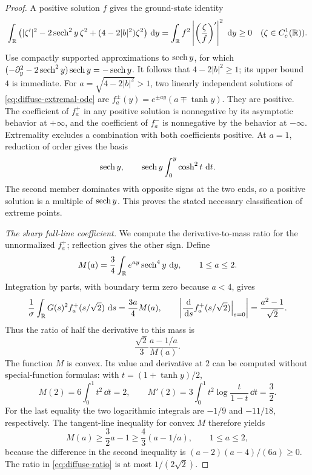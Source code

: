 \begin{proof}
A positive solution $f$ gives the ground-state identity
\[
 \int_\mathbb R\big(|\zeta'|^2-2\operatorname{sech}^2y\,\zeta^2
                         +(4-2|b|^2)\zeta^2\big)\,\,\mathrm d y
 =\int_\mathbb R f^2\left|\left(\frac\zeta f\right)'\right|^2\,\,\mathrm d y\ge0
 \quad(\zeta\in C_c^1(\mathbb R)).
\]
Use compactly supported approximations to $\operatorname{sech} y$, for which
$(-\partial_y^2-2\operatorname{sech}^2y)\operatorname{sech} y=-\operatorname{sech} y$.
It follows that $4-2|b|^2\ge1$; its upper bound $4$ is immediate.
For $a=\sqrt{4-2|b|^2}>1$, two linearly independent solutions of
\eqref{eq:diffuse-extremal-ode} are
$f_a^\pm(y)=e^{\pm ay}(a\mp\tanh y)$. They are positive. The
coefficient of $f_a^+$ in any positive solution is nonnegative by its
asymptotic behavior at $+\infty$, and the coefficient of $f_a^-$ is
nonnegative by the behavior at $-\infty$. Extremality excludes a
combination with both coefficients positive. At $a=1$, reduction of
order gives the basis
\[
 \operatorname{sech} y,\qquad \operatorname{sech} y\int_0^y\cosh^2t\,\,\mathrm d t.
\]
The second member dominates with opposite signs at the two ends, so a
positive solution is a multiple of $\operatorname{sech} y$. This proves the stated
necessary classification of extreme points.

\emph{The sharp full-line coefficient.}
We compute the derivative-to-mass ratio for the unnormalized $f_a^+$;
reflection gives the other sign. Define
\[
 M(a)=\frac34\int_\mathbb R e^{ay}\operatorname{sech}^4y\,\,\mathrm d y,\qquad 1\le a\le2.
\]
Integration by parts, with boundary term zero because $a<4$, gives
\[
 \frac1\sigma\int_\mathbb R G(s)^2f_a^+(s/\sqrt2)\,\,\mathrm d s
       =\frac{3a}{4}M(a),\qquad
 \left|\frac{\,\mathrm d}{\,\mathrm d s}f_a^+(s/\sqrt2)\Big|_{s=0}\right|
       =\frac{a^2-1}{\sqrt2}.
\]
Thus the ratio of half the derivative to this mass is
\begin{equation}\label{eq:diffuse-ratio}
 \frac{\sqrt2}{3}\frac{a-1/a}{M(a)}.
\end{equation}
The function $M$ is convex. Its value and derivative at $2$ can be
computed without special-function formulas: with $t=(1+\tanh y)/2$,
\[
 M(2)=6\int_0^1t^2\,\dd t=2,\qquad
 M'(2)=3\int_0^1t^2\log\frac{t}{1-t}\,\dd t=\frac32.
\]
For the last equality the two logarithmic integrals are $-1/9$ and
$-11/18$, respectively. The tangent-line inequality for convex $M$
therefore yields
\begin{equation}\label{eq:diffuse-M-bound}
 M(a)\ge\frac32a-1\ge\frac43(a-1/a),\qquad 1\le a\le2,
\end{equation}
because the difference in the second inequality is
$(a-2)(a-4)/(6a)\ge0$. The ratio in \eqref{eq:diffuse-ratio} is at
most $1/(2\sqrt2)$.


\end{proof}
